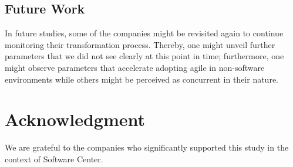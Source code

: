 \documentclass[10pt,a4paper]{IEEEtran} %
\begin{document}
\subsection{Future Work}

In future studies, some of the companies might be revisited again to continue monitoring their transformation process. Thereby, one might unveil further parameters that we did not see clearly at this point in time; furthermore, one might observe parameters that accelerate adopting agile in non-software environments while others might be perceived as concurrent in their nature.


\section*{Acknowledgment}
We are grateful to the companies who significantly supported this study in the context of Software Center.




\end{document}
